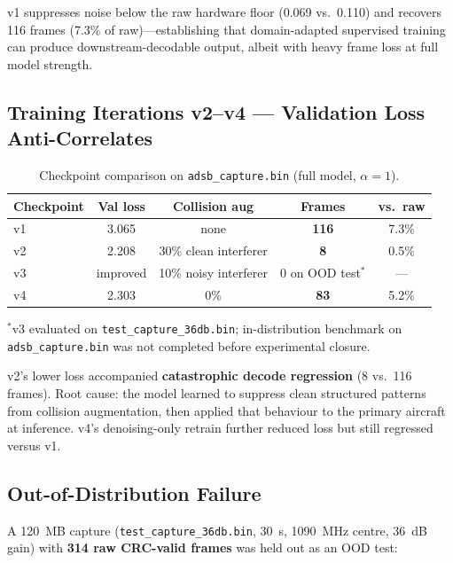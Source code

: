 \documentclass[11pt,a4paper]{article}
\begin{document}
v1 suppresses noise below the raw hardware floor (0.069 vs.\ 0.110) and
recovers 116 frames (7.3\% of raw)---establishing that domain-adapted
supervised training can produce downstream-decodable output, albeit with heavy
frame loss at full model strength.

\subsection{Training Iterations v2--v4 --- Validation Loss Anti-Correlates}

\begin{table}[htbp]
  \centering
  \caption{Checkpoint comparison on \texttt{adsb\_capture.bin} (full model,
  $\alpha=1$).}
  \label{tab:checkpoint-comparison}
  \begin{tabular}{@{}lcccc@{}}
    \toprule
    Checkpoint & Val loss & Collision aug & Frames & vs.\ raw \\
    \midrule
    v1 & 3.065 & none & \textbf{116} & 7.3\% \\
    v2 & 2.208 & 30\% clean interferer & \textbf{8} & 0.5\% \\
    v3 & improved & 10\% noisy interferer & 0 on OOD test$^*$ & --- \\
    v4 & 2.303 & 0\% & \textbf{83} & 5.2\% \\
    \bottomrule
  \end{tabular}
  \vspace{0.5em}
  \raggedright\small $^*$v3 evaluated on \texttt{test\_capture\_36db.bin};
  in-distribution benchmark on \texttt{adsb\_capture.bin} was not completed
  before experimental closure.
\end{table}

v2's lower loss accompanied \textbf{catastrophic decode regression} (8 vs.\ 116
frames). Root cause: the model learned to suppress clean structured patterns
from collision augmentation, then applied that behaviour to the primary
aircraft at inference. v4's denoising-only retrain further reduced loss but
still regressed versus v1.

\subsection{Out-of-Distribution Failure}

A 120~MB capture (\texttt{test\_capture\_36db.bin}, 30~s, 1090~MHz centre,
36~dB gain) with \textbf{314 raw CRC-valid frames} was held out as an OOD test:
\end{document}
